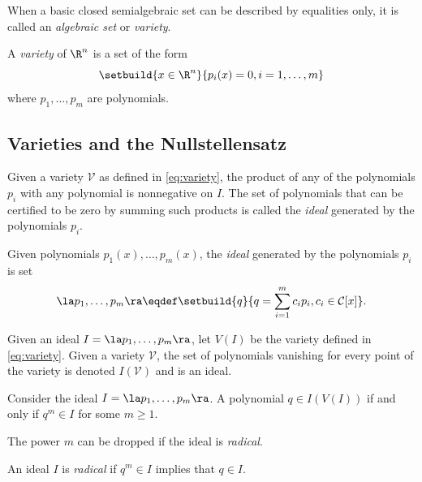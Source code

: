 \documentclass[11pt,twoside,a4paper,openright]{uclouvain-thesis}
\begin{document}
When a basic closed semialgebraic set can be described by equalities only,
it is called an \emph{algebraic set} or \emph{variety}.
\begin{mydef}
  A \emph{variety} of $\R^n$ is a set of the form
  \begin{equation}
    \label{eq:variety}
    \setbuild{x \in \R^n}{p_i(x) = 0, i = 1, \ldots, m}
  \end{equation}
  where $p_1, \ldots, p_m$ are polynomials.
\end{mydef}

\subsection{Varieties and the Nullstellensatz}

Given a variety $\mathcal{V}$ as defined in \eqref{eq:variety},
the product of any of the polynomials $p_i$ with any polynomial is nonnegative on $I$.
The set of polynomials that can be certified to be zero by summing
such products is called the \emph{ideal} generated by the polynomials $p_i$.

\begin{mydef}
  Given polynomials $p_1(x), \ldots, p_m(x)$, the \emph{ideal} generated by
  the polynomials $p_i$ is set
  \begin{equation}
    \label{eq:ideal}
    \la p_1, \ldots, p_m \ra \eqdef
    \setbuild{q}{q = \sum_{i = 1}^m c_i p_i, c_i \in \mathcal{C}[x]}.
  \end{equation}
\end{mydef}

Given an ideal $I = \la p_1, \ldots, p_m \ra$, let $V(I)$ be the variety defined in \eqref{eq:variety}.
Given a variety $\mathcal{V}$, the set of polynomials vanishing for every point of the variety is denoted $I(\mathcal{V})$ and is an ideal.

\begin{mytheo}
  Consider the ideal $I = \la p_1, \ldots, p_m \ra$.
  A polynomial $q \in I(V(I))$ if and only if $q^m \in I$ for some $m \ge 1$.
\end{mytheo}

The power $m$ can be dropped if the ideal is \emph{radical}.

\begin{mydef}
  An ideal $I$ is \emph{radical} if $q^m \in I$ implies that $q \in I$.
\end{mydef}
\end{document}
